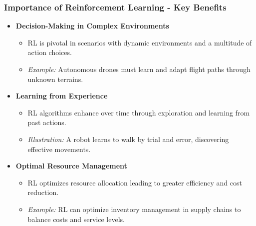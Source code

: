 \documentclass[aspectratio=169]{beamer}
\begin{document}
\begin{frame}[fragile]
  \frametitle{Importance of Reinforcement Learning - Key Benefits}
  \begin{itemize}
    \item \textbf{Decision-Making in Complex Environments}
      \begin{itemize}
        \item RL is pivotal in scenarios with dynamic environments and a multitude of action choices.
        \item \textit{Example:} Autonomous drones must learn and adapt flight paths through unknown terrains.
      \end{itemize}
      
    \item \textbf{Learning from Experience}
      \begin{itemize}
        \item RL algorithms enhance over time through exploration and learning from past actions.
        \item \textit{Illustration:} A robot learns to walk by trial and error, discovering effective movements.
      \end{itemize}
    
    \item \textbf{Optimal Resource Management}
      \begin{itemize}
        \item RL optimizes resource allocation leading to greater efficiency and cost reduction.
        \item \textit{Example:} RL can optimize inventory management in supply chains to balance costs and service levels.
      \end{itemize}
  \end{itemize}
\end{frame}
\end{document}
